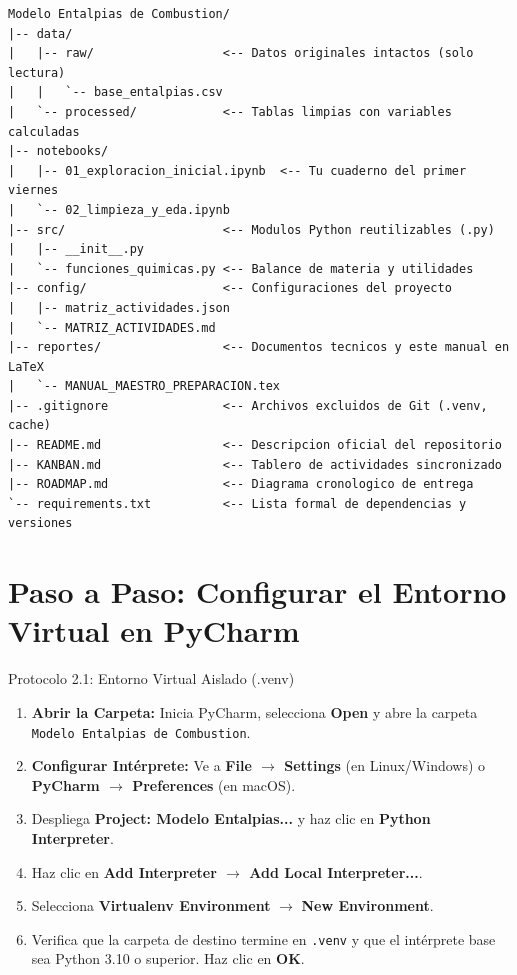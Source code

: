 \documentclass[11pt,letterpaper]{report}
\begin{document}
\begin{tcolorbox}[colback=codebg,colframe=darkgray,title=Estructura Estandarizada del Proyecto]
\begin{verbatim}
Modelo Entalpias de Combustion/
|-- data/
|   |-- raw/                  <-- Datos originales intactos (solo lectura)
|   |   `-- base_entalpias.csv
|   `-- processed/            <-- Tablas limpias con variables calculadas
|-- notebooks/
|   |-- 01_exploracion_inicial.ipynb  <-- Tu cuaderno del primer viernes
|   `-- 02_limpieza_y_eda.ipynb
|-- src/                      <-- Modulos Python reutilizables (.py)
|   |-- __init__.py
|   `-- funciones_quimicas.py <-- Balance de materia y utilidades
|-- config/                   <-- Configuraciones del proyecto
|   |-- matriz_actividades.json
|   `-- MATRIZ_ACTIVIDADES.md
|-- reportes/                 <-- Documentos tecnicos y este manual en LaTeX
|   `-- MANUAL_MAESTRO_PREPARACION.tex
|-- .gitignore                <-- Archivos excluidos de Git (.venv, cache)
|-- README.md                 <-- Descripcion oficial del repositorio
|-- KANBAN.md                 <-- Tablero de actividades sincronizado
|-- ROADMAP.md                <-- Diagrama cronologico de entrega
`-- requirements.txt          <-- Lista formal de dependencias y versiones
\end{verbatim}
\end{tcolorbox}

\section{Paso a Paso: Configurar el Entorno Virtual en PyCharm}

\begin{protocolbox}{Protocolo 2.1: Entorno Virtual Aislado (.venv)}
\begin{enumerate}[leftmargin=*]
    \item \textbf{Abrir la Carpeta:} Inicia PyCharm, selecciona \textbf{Open} y abre la carpeta \texttt{Modelo Entalpias de Combustion}.
    \item \textbf{Configurar Intérprete:} Ve a \textbf{File $\longrightarrow$ Settings} (en Linux/Windows) o \textbf{PyCharm $\longrightarrow$ Preferences} (en macOS).
    \item Despliega \textbf{Project: Modelo Entalpias...} y haz clic en \textbf{Python Interpreter}.
    \item Haz clic en \textbf{Add Interpreter $\longrightarrow$ Add Local Interpreter...}.
    \item Selecciona \textbf{Virtualenv Environment} $\longrightarrow$ \textbf{New Environment}.
    \item Verifica que la carpeta de destino termine en \texttt{.venv} y que el intérprete base sea Python 3.10 o superior. Haz clic en \textbf{OK}.
\end{enumerate}
\end{protocolbox}
\end{document}
